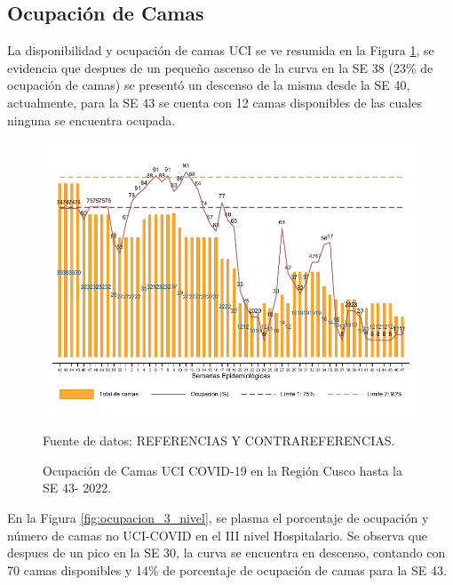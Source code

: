 \documentclass[12pt,a4paper,openany]{book}
\begin{document}
		
	\clearpage
	\subsection*{Ocupación de Camas}
	\noindent La disponibilidad y ocupación de camas UCI se ve resumida en la Figura \ref{fig:ocupacion_uci}, se evidencia que despues de un pequeño ascenso de la curva en la SE 38 (23$\%$ de ocupación de camas) se presentó un descenso de la misma desde la SE 40, actualmente, para la SE 43 se cuenta con 12 camas disponibles de las cuales ninguna se encuentra ocupada.
	
	\begin{figure}[h]
		\caption{Ocupación de Camas UCI COVID-19 en la Región Cusco hasta la SE 43- 2022.}\label{fig:ocupacion_uci}
		\begin{center}
			\includegraphics[width=0.95\linewidth]{../figuras/uci.pdf}
		\end{center}
		{\footnotesize {Fuente de datos: REFERENCIAS Y CONTRAREFERENCIAS.}}
	\end{figure}
	\cleardoublepage
	
	En la Figura \ref{fig:ocupacion_3_nivel}, se plasma el porcentaje de ocupación y número de camas no UCI-COVID en el III nivel Hospitalario. Se observa que despues de un pico en la SE 30, la curva se encuentra en descenso, contando con 70 camas disponibles y 14$\%$ de porcentaje de ocupación de camas para la SE 43.
	
\end{document}
